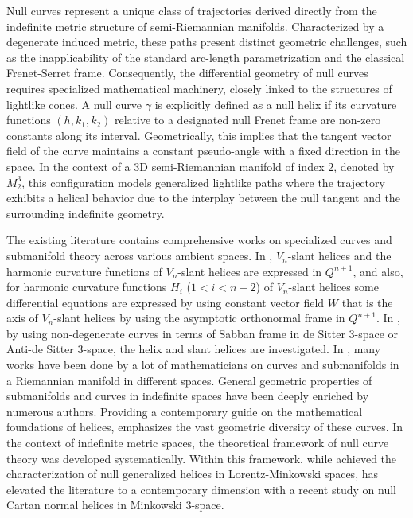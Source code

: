 \documentclass [reqno]{amsart}
\theoremstyle{plain}
\numberwithin{equation}{section}
\begin{document}
Null curves represent a unique class of trajectories derived directly from the indefinite metric structure of semi-Riemannian manifolds. Characterized by a degenerate induced metric, these paths present distinct geometric challenges, such as the inapplicability of the standard arc-length parametrization and the classical Frenet-Serret frame. Consequently, the differential geometry of null curves requires specialized mathematical machinery, closely linked to the structures of lightlike cones. A null curve $\gamma$ is explicitly defined as a null helix if its curvature functions $(h,k_1,k_2)$ relative to a designated null Frenet frame are non-zero constants along its interval. Geometrically, this implies that the tangent vector field of the curve maintains a constant pseudo-angle with a fixed direction in the space. In the context of a 3D semi-Riemannian manifold of index $2$, denoted by $M_2^3$, this configuration models generalized lightlike paths where the trajectory exhibits a helical behavior due to the interplay between the null tangent and the surrounding indefinite geometry.

The existing literature contains comprehensive works on specialized curves and submanifold theory across various ambient spaces. In \cite{1}, $V_n$-slant helices and the harmonic curvature functions of $V_n$-slant helices are expressed in $Q^{n+1}$, and also, for harmonic curvature functions $H_i$ ($1 < i < n-2$) of $V_n$-slant helices some differential equations are expressed by using constant vector field $W$ that is the axis of $V_n$-slant helices by using the asymptotic orthonormal frame in $Q^{n+1}$. In \cite{2}, by using non-degenerate curves in terms of Sabban frame in de Sitter 3-space or Anti-de Sitter 3-space, the helix and slant helices are investigated. In \cite{5,7,10,11}, many works have been done by a lot of mathematicians on curves and submanifolds in a Riemannian manifold in different spaces. General geometric properties of submanifolds and curves in indefinite spaces have been deeply enriched by numerous authors. Providing a contemporary guide on the mathematical foundations of helices, \cite{12} emphasizes the vast geometric diversity of these curves. In the context of indefinite metric spaces, the theoretical framework of null curve theory was developed systematically. Within this framework, while \cite{15} achieved the characterization of null generalized helices in Lorentz-Minkowski spaces, \cite{14} has elevated the literature to a contemporary dimension with a recent study on null Cartan normal helices in Minkowski 3-space.
\end{document}
